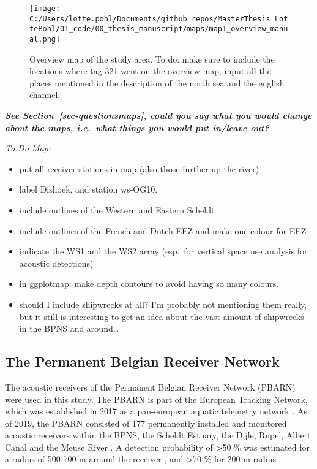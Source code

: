\documentclass[
  authoryear,
  review,
  3p]{elsarticle}
\begin{document}
\begin{figure}

{\centering \texttt{[image: C:/Users/lotte.pohl/Documents/github\_repos/MasterThesis\_LottePohl/01\_code/00\_thesis\_manuscript/maps/map1\_overview\_manual.png]}

}

\caption{\label{fig-mapoverview}Overview map of the study area. To do:
make sure to include the locations where tag 321 went on the overview
map, input all the places mentioned in the description of the north sea
and the english channel.}

\end{figure}

\textbf{\emph{See Section~\ref{sec-questionsmaps}, could you say what
you would change about the maps, i.e.~what things you would put in/leave
out?}}

\emph{To Do Map:}

\begin{itemize}
\item
  put all receiver stations in map (also those further up the river)
\item
  label Dishoek, and station ws-OG10.
\item
  include outlines of the Western and Eastern Scheldt
\item
  include outlines of the French and Dutch EEZ and make one colour for
  EEZ
\item
  indicate the WS1 and the WS2 array (esp.~for vertical space use
  analysis for acoustic detections)
\item
  in ggplotmap: make depth contours to avoid having so many colours.
\item
  should I include shipwrecks at all? I'm probably not mentioning them
  really, but it still is interesting to get an idea about the vast
  amount of shipwrecks in the BPNS and around\ldots{}
\end{itemize}

\hypertarget{the-permanent-belgian-receiver-network}{%
\subsection{The Permanent Belgian Receiver
Network}\label{the-permanent-belgian-receiver-network}}

The acoustic receivers of the Permanent Belgian Receiver Network (PBARN)
were used in this study. The PBARN is part of the European Tracking
Network, which was established in 2017 as a pan-european aquatic
telemetry network \citep{reubens_2019}. As of 2019, the PBARN consisted
of 177 permanently installed and monitored acoustic receivers within the
BPNS, the Scheldt Estuary, the Dijle, Rupel, Albert Canal and the Meuse
River \citep{reubens_2018}. A detection probability of \textgreater50 \%
was estimated for a radius of 500-700 m around the receiver
\citep{goossens_2022}, and \textgreater70 \% for 200 m radius
\citep{reubens_2018}.
\end{document}
